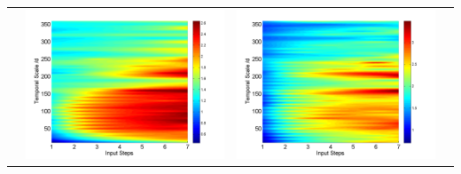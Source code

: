 \documentclass[draft,wrr]{AGUTeX}
\begin{document}
\begin{article}
\begin{table}[H]
\begin{tabular}{cccc}
&\begin{minipage}{.3\textwidth}\includegraphics[width=\linewidth]{resultgraph/11532500p.png}\end{minipage}
&\begin{minipage}{.3\textwidth}\includegraphics[width=\linewidth]{resultgraph/11532500pep.png}\end{minipage}

\end{tabular}
\end{table}
\end{article}
\end{document}

